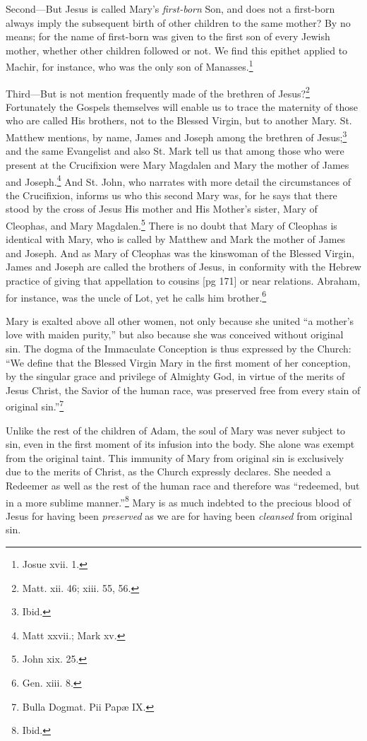 Second—But Jesus is called Mary's \emph{first-born}
Son, and does not a first-born always imply the
subsequent birth of other children to the same
mother? By no means; for the name of first-born
was given to the first son of every Jewish mother,
whether other children followed or not. We find
this epithet applied to Machir, for instance, who
was the only son of Manasses.\footnote{Josue xvii. 1.}

Third—But is not mention frequently made of
the brethren of Jesus?\footnote{Matt. xii.
46; xiii. 55, 56.} Fortunately the Gospels
themselves will enable us to trace the maternity
of those who are called His brothers, not to the
Blessed Virgin, but to another Mary. St. Matthew
mentions, by name, James and Joseph among
the brethren of Jesus;\footnote{Ibid.}
and the same Evangelist
and also St. Mark tell us that among those who
were present at the Crucifixion were Mary Magdalen
and Mary the mother of James and Joseph.\footnote{Matt xxvii.; Mark xv.}
And St. John, who narrates with more detail the
circumstances of the Crucifixion, informs us who
this second Mary was, for he says that there
stood by the cross of Jesus His mother and His
Mother's sister, Mary of Cleophas, and Mary
Magdalen.\footnote{John xix.
25.} There is no doubt that Mary of Cleophas
is identical with Mary, who is called by Matthew
and Mark the mother of James and Joseph.
And as Mary of Cleophas was the kinswoman of
the Blessed Virgin, James and Joseph are called
the brothers of Jesus, in conformity with the Hebrew
practice of giving that appellation to cousins
[pg 171]
or near relations. Abraham, for instance, was
the uncle of Lot, yet he calls him brother.\footnote{Gen. xiii. 8.}

Mary is exalted above all other women, not only
because she united “a mother's love with maiden
purity,” but also because she was conceived without
original sin. The dogma of the Immaculate
Conception is thus expressed by the Church: “We
define that the Blessed Virgin Mary in the first
moment of her conception, by the singular grace
and privilege of Almighty God, in virtue of the
merits of Jesus Christ, the Savior of the human
race, was preserved free from every stain of
original sin.”\footnote{Bulla Dogmat. Pii Papæ IX.}

Unlike the rest of the children of Adam, the soul
of Mary was never subject to sin, even in the first
moment of its infusion into the body. She alone
was exempt from the original taint. This immunity
of Mary from original sin is exclusively
due to the merits of Christ, as the Church expressly
declares. She needed a Redeemer as well
as the rest of the human race and therefore was
“redeemed, but in a more sublime manner.”\footnote{Ibid.}
Mary is as much indebted to the precious blood
of Jesus for having been \emph{preserved} as we are for
having been \emph{cleansed} from original sin.

